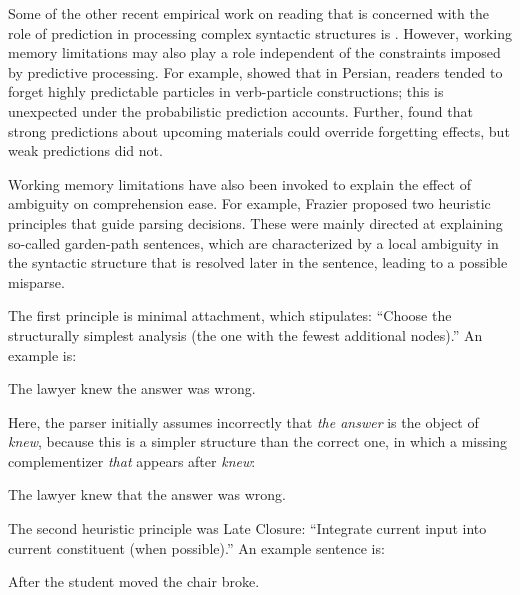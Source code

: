 \documentclass{cambridge7A}\usepackage[]{graphicx}\usepackage[]{color}
\begin{document}
Some of the other recent empirical work on
reading that is concerned with the role of prediction in processing
complex syntactic structures is
\cite{levyfedgibsonRussian,levy2012processing,LevyKeller2013,VasishthMertzenJaegerGelman2018,linzenuncertainty}. However,
 working memory limitations may also play a role independent of
the constraints imposed by predictive processing. For example,
\cite{SafaviEtAlFrontiers2016} showed that in Persian, readers tended
to forget highly predictable particles in verb-particle constructions; 
this is unexpected under the probabilistic prediction
accounts. Further, \cite{HusainEtAl2014} found that strong predictions
about upcoming materials could override forgetting effects, but weak
predictions did not.

Working memory limitations have also been invoked to explain the effect of ambiguity on comprehension ease.
For example, Frazier proposed two heuristic principles that guide parsing
decisions. These were mainly directed at explaining so-called garden-path sentences, which are characterized by a local ambiguity in the syntactic structure that is resolved later in the sentence, leading to a possible misparse.

The first principle is minimal attachment, which stipulates: 
 ``Choose the structurally simplest analysis (the one with the fewest additional nodes).'' An example is:

\begin{exe} 
\ex  \label{ambiguity}
The lawyer knew the answer was wrong.
\end{exe}

Here, the parser initially assumes incorrectly that \textit{the answer} is the object of \textit{knew}, because this is a simpler structure than the correct one, in which a missing complementizer \textit{that} appears after \textit{knew}: 

\begin{exe} 
\ex  \label{ambiguitythat}
The lawyer knew that the answer was wrong.
\end{exe}

The second heuristic principle was Late Closure:  ``Integrate current input into current  constituent (when possible).'' An example sentence is:

\begin{exe} 
\ex  \label{ambiguity2}
After the student moved the chair broke. 
\end{exe}
\end{document}
